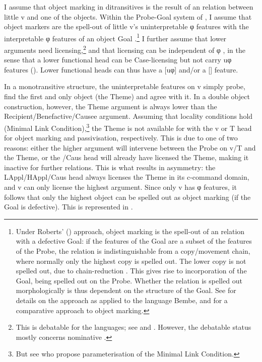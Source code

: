 \documentclass[output=paper]{LSP/langsci}
\begin{document}
I assume that  object marking in ditransitives is the result of an  relation between little v and one of the objects. Within the Probe-Goal system of  \citep{Chomsky2001}, I assume that object markers are the spell-out of little v’s uninterpretable φ features  with the interpretable φ features of an object Goal \citep{Roberts2010}.\footnote{Under Roberts’ (\citeyear{Roberts2010}) approach, object marking is the spell-out of an  relation with a defective Goal: if the features of the Goal are a subset of the features of the Probe, the  relation is indistinguishable from a copy/movement chain, where normally only the highest copy is spelled out. The lower copy is not spelled out, due to chain-reduction \citep{Nunes2004}. This gives rise to incorporation of the Goal, being spelled out on the Probe. Whether the  relation is spelled out morphologically is thus dependent on the structure of the Goal. See \citet{Iorio2014} for details on the approach as applied to the  language Bembe, and \citet{VanderWal2015objectclitics} for a comparative approach to  object marking.} I further assume that lower arguments need  licensing,\footnote{This is debatable for the  languages; see \citet{Diercks2012,VanderWal2015abstractcase} and \citet{SheehanVanderWal2016}. However, the debatable status mostly concerns nominative .}  and that  licensing can be independent of φ , in the sense that a lower functional head can be Case-licensing but not carry uφ features (\citealt{Baker2012Onthe,Preminger2014,Bárány2015}). Lower functional heads can thus have a [uφ] and/or a [] feature.

  In a monotransitive structure, the uninterpretable features on v simply probe, find the first and only object (the Theme) and agree with it. In a double object construction, however, the Theme argument is always lower than the Recipient\slash Benefactive\slash Causee argument. Assuming that locality conditions hold (Minimal Link Condition),\footnote{But see \citet{BakerCollins2006} who propose parameterisation of the Minimal Link Condition.}     the Theme is not available for  with the v or T head for object marking and passivisation, respectively. This is due to one of two reasons: either the higher argument will intervene between the Probe on v/T and the Theme, or the /Caus head will already have licensed the Theme, making it inactive for further  relations. This is what results in asymmetry: the LAppl/HAppl/Caus head always licenses the Theme in its c-command domain, and v can only license the highest argument. Since only v has φ features, it follows that only the highest object can be spelled out as object marking (if the Goal is defective). This is represented in .
\end{document}
